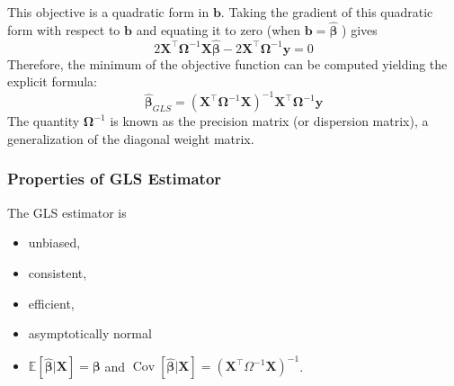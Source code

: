 \documentclass[13pt]{article}
\theoremstyle{definition}
\theoremstyle{remark}
\newcommand{\EE}{\mathbb{E}}
\begin{document}
\begin{enumerate}
This objective is a quadratic form in $\mathbf{b}$.
Taking the gradient of this quadratic form with respect to $\mathbf{b}$ and equating it to zero (when $\mathbf{b}=\hat{\bm{\beta}}$ ) gives
$$
2 \mathbf{X}^{\top} \mathbf{\Omega}^{-1} \mathbf{X} \hat{\bm{\beta}}-2 \mathbf{X}^{\top} \mathbf{\Omega}^{-1} \bm{y}=0
$$
Therefore, the minimum of the objective function can be computed yielding the explicit formula:
$$
\hat{\bm{\beta}}_{GLS}=\left(\mathbf{X}^{\top} \mathbf{\Omega}^{-1} \mathbf{X}\right)^{-1} \mathbf{X}^{\top} \mathbf{\Omega}^{-1} \bm{y}
$$
The quantity $\mathbf{\Omega}^{-1}$ is known as the precision matrix (or dispersion matrix), a generalization of the diagonal weight matrix.
\end{enumerate}


\subsubsection{Properties of GLS Estimator}
The GLS estimator is 
\begin{itemize}
    \item unbiased,
    \item consistent,
    \item efficient,
    \item asymptotically normal
    \item $\EE[\hat{\bm{\beta}} | \mathbf{X}]=\bm{\beta}$ and $\operatorname{Cov}[\hat{\bm{\beta}} | \mathbf{X}]=\left(\mathbf{X}^{\top} \Omega^{-1} \mathbf{X}\right)^{-1}$.
\end{itemize}    
\end{document}
